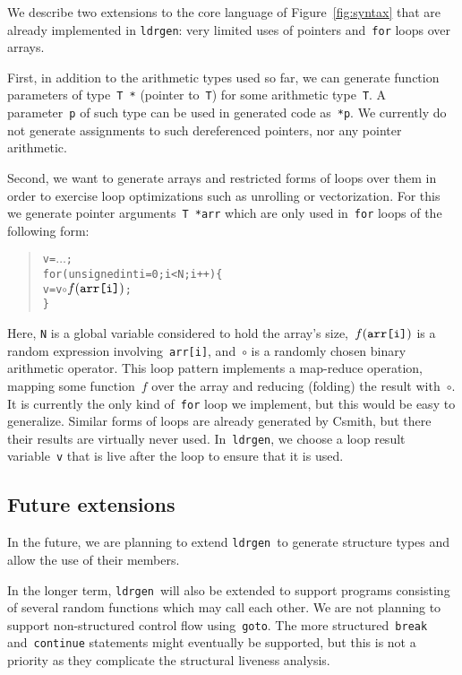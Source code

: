 \documentclass{llncs}
\newcommand\ldrgen{\texttt{ldrgen}}
\begin{document}
We describe two extensions to the core language of Figure~\ref{fig:syntax}
that are already implemented in \ldrgen: very limited uses of pointers
and~\verb|for| loops over arrays.

First, in addition to the arithmetic types used so far, we can generate
function parameters of type~\verb|T *| (pointer to~\verb|T|) for some
arithmetic type~\verb|T|. A parameter~\verb|p| of such type can be used in
generated code as~\verb|*p|. We currently do not generate assignments to
such dereferenced pointers, nor any pointer arithmetic.

Second, we want to generate arrays and restricted forms of loops over them
in order to exercise loop optimizations such as unrolling or vectorization.
For this we generate pointer arguments~\verb|T *arr| which are only
used in~\verb|for| loops of the following form:

\begin{quote}
\begin{alltt}
v = \(\dots\);
for (unsigned int i = 0; i < N; i++) \{
    v = v \(\circ\) \(f(\mbox{\texttt{arr[i]}})\);
\}
\end{alltt}
\end{quote}

Here, \verb|N| is a global variable considered to hold the array's
size,~\(f(\mbox{\texttt{arr[i]}})\) is a random expression
involving~\verb|arr[i]|, and~\(\circ\) is a randomly chosen binary
arithmetic operator. This loop pattern implements a map-reduce operation,
mapping some function~\(f\) over the array and reducing (folding) the result
with~\(\circ\). It is currently the only kind of~\verb|for| loop we
implement, but this would be easy to generalize.
%
Similar forms of loops are already generated by Csmith, but there their
results are virtually never used. In~\ldrgen, we choose a loop result
variable~\verb|v| that is live after the loop to ensure that it is used.

\subsection{Future extensions}

In the future, we are planning to extend \ldrgen\ to generate structure
types and allow the use of their members.

In the longer term, \ldrgen\ will also be extended to support programs
consisting of several random functions which may call each other. We are not
planning to support non-structured control flow using~\verb|goto|. The more
structured~\verb|break| and~\verb|continue| statements might eventually be
supported, but this is not a priority as they complicate the structural
liveness analysis.
\end{document}
